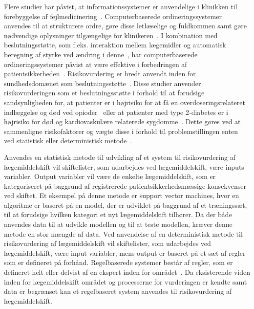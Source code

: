 Flere studier har påvist, at informationssystemer er anvendelige i klinikken til forebyggelse af fejlmedicinering~\citep{Agrawal2009, Kaushal2002, Stenner2010, Fischer2008, Simpson2008, Bates2000a}. Computerbaserede ordineringssystemer anvendes til at strukturere ordre, gøre disse letlæselige og fuldkommen samt gøre nødvendige oplysninger tilgængelige for klinikeren~\citep{Agrawal2009,Bates2000a}. I kombination med beslutningsstøtte, som f.eks. interaktion mellem lægemidler og automatisk beregning af styrke ved ændring i denne~\citep{Agrawal2009}, har computerbaserede ordineringssystemer påvist at være effektive i forbedringen af patientsikkerheden~\citep{Agrawal2009, Bates2000a}. Risikovurdering er bredt anvendt inden for sundhedsdomænet som beslutningsstøtte~\citep{Geissert2018, Rawshani2018}. Disse studier anvender risikovurderingen som et beslutningsstøtte i forhold til at forudsige sandsynligheden for, at patienter er i højrisiko for at få en overdoseringsrelateret indlæggelse og død ved opioder~\citep{Geissert2018} eller at patienter med type 2-diabetes er i højrisiko for død og kardiovaskulære relaterede sygdomme~\citep{Rawshani2018}. Dette gøres ved at sammenligne risikofaktorer og vægte disse i forhold til problemstillingen enten ved statistisk eller deterministisk metode~\citep{Boyko1990}.

Anvendes en statistisk metode til udvikling af et system til risikovurdering af lægemiddelskift vil skiftelister, som udarbejdes ved lægemiddelskift, være inputs variabler. Output variabler vil være de enkelte lægemiddelskift, som er kategoriseret på baggrund af registrerede patientsikkerhedsmæssige konsekvenser ved skiftet. Et eksempel på denne metode er support vector machines, hvor en algoritme er baseret på en model, der er udviklet på baggrund af et træningssæt, til at forudsige hvilken kategori et nyt lægemiddelskift tilhører. Da der både anvendes data til at udvikle modellen og til at teste modellen, kræver denne metode en stor mængde af data. Ved anvendelse af en deterministisk metode til risikovurdering af lægemiddelskift vil skiftelister, som udarbejdes ved lægemiddelskift, være input variabler, mens output er baseret på et sæt af regler som er defineret på forhånd. Regelbaserede systemer består af regler, som er defineret helt eller delvist af en ekspert inden for området~\citep{Crina2008}. Da eksisterende viden inden for lægemiddelskift området og processerne for vurderingen er kendte samt data er begrænset kan et regelbaseret system anvendes til risikovurdering af lægemiddelskift. 


